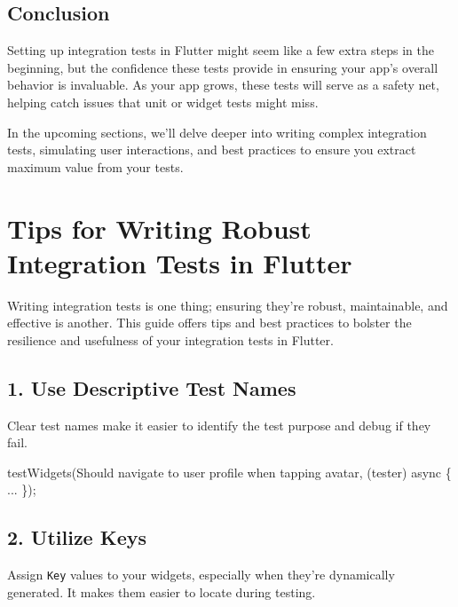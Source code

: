 \documentclass[
]{article}
\newenvironment{Shaded}{\begin{snugshade}}{\end{snugshade}}
\newcommand{\AttributeTok}[1]{\textcolor[rgb]{0.16,0.50,0.73}{#1}}
\newcommand{\NormalTok}[1]{\textcolor[rgb]{0.81,0.81,0.76}{#1}}
\newcommand{\OperatorTok}[1]{\textcolor[rgb]{0.81,0.81,0.76}{#1}}
\newcommand{\StringTok}[1]{\textcolor[rgb]{0.96,0.31,0.31}{#1}}
\begin{document}
\subsection{Conclusion}\label{conclusion-9}

Setting up integration tests in Flutter might seem like a few extra
steps in the beginning, but the confidence these tests provide in
ensuring your app's overall behavior is invaluable. As your app grows,
these tests will serve as a safety net, helping catch issues that unit
or widget tests might miss.

In the upcoming sections, we'll delve deeper into writing complex
integration tests, simulating user interactions, and best practices to
ensure you extract maximum value from your tests.

\section{Tips for Writing Robust Integration Tests in
Flutter}\label{tips-for-writing-robust-integration-tests-in-flutter}

Writing integration tests is one thing; ensuring they're robust,
maintainable, and effective is another. This guide offers tips and best
practices to bolster the resilience and usefulness of your integration
tests in Flutter.

\subsection{1. Use Descriptive Test
Names}\label{use-descriptive-test-names}

Clear test names make it easier to identify the test purpose and debug
if they fail.

\begin{Shaded}
\begin{Highlighting}[]
\NormalTok{testWidgets(}\StringTok{\textquotesingle{}Should navigate to user profile when tapping avatar\textquotesingle{}}\OperatorTok{,}\NormalTok{ (tester) }\AttributeTok{async} \OperatorTok{\{} \OperatorTok{...} \OperatorTok{\}}\NormalTok{);}
\end{Highlighting}
\end{Shaded}

\subsection{2. Utilize Keys}\label{utilize-keys}

Assign \texttt{Key} values to your widgets, especially when they're
dynamically generated. It makes them easier to locate during testing.
\end{document}
